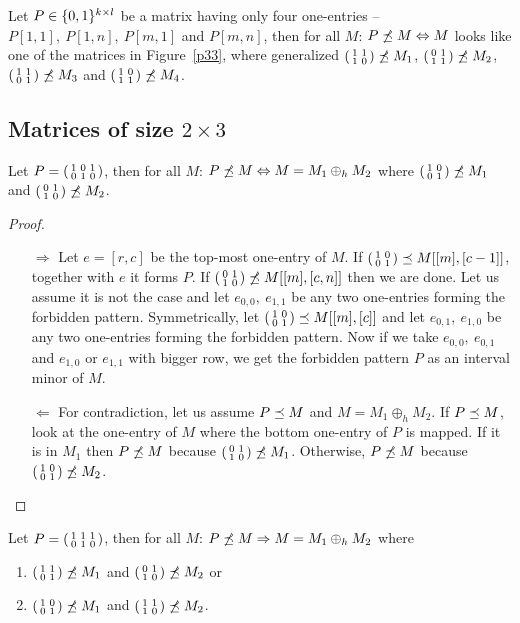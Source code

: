 \begin{thm}
Let $P\in\Pat$ be a matrix having only four one-entries -- $P[1,1],\ P[1,n],\ P[m,1]$ and $P[m,n]$, then for all $M$: $\PnimM\Leftrightarrow M$ looks like one of the matrices in Figure~\ref{p33}, where generalized $\smm{1&1\\1&0}\nim M_1$, $\smm{0&1\\1&1}\nim M_2$, $\smm{1&1\\0&1}\nim M_3$ and $\smm{1&0\\1&1}\nim M_4$.
\end{thm}

\subsection{Matrices of size $2\times3$}
\begin{thm}
Let $P=\smm{1&0&1\\0&1&0}$, then for all $M$: $\PnimM\Leftrightarrow M=M_1\oplus_hM_2$ where $\smm{1&0\\0&1}\nim M_1$ and $\smm{0&1\\1&0}\nim M_2$.
\end{thm}
\begin{proof}
\begin{itemize}
\item[$\Rightarrow$] Let $e=[r,c]$ be the top-most one-entry of $M$. If $\smm{1&0\\0&1}\im M[[m],[c-1]]$, together with $e$ it forms $P$. If $\smm{0&1\\1&0}\nim M[[m],[c,n]]$ then we are done. Let us assume it is not the case and let $e_{0,0},\ e_{1,1}$ be any two one-entries forming the forbidden pattern. Symmetrically, let $\smm{1&0\\0&1}\im M[[m],[c]]$ and let $e_{0,1},\ e_{1,0}$ be any two one-entries forming the forbidden pattern. Now if we take $e_{0,0},\ e_{0,1}$ and $e_{1,0}$ or $e_{1,1}$ with bigger row, we get the forbidden pattern $P$ as an interval minor of $M$. 
\item[$\Leftarrow$] For contradiction, let us assume $\PimM$ and $M=M_1\oplus_hM_2$. If $\PimM$, look at the one-entry of $M$ where the bottom one-entry of $P$ is mapped. If it is in $M_1$ then $\PnimM$ because $\smm{0&1\\1&0}\nim M_1$. Otherwise, $\PnimM$ because $\smm{1&0\\0&1}\nim M_2$.
\end{itemize}
\end{proof}
\begin{lemma}
\label{lemma2}
Let $P=\smm{1&1&1\\0&1&0}$, then for all $M$: $\PnimM\Rightarrow M=M_1\oplus_hM_2$ where
\begin{enumerate}
\item $\smm{1&1\\0&1}\nim M_1$ and $\smm{0&1\\1&0}\nim M_2$ or
\item $\smm{1&0\\0&1}\nim M_1$ and $\smm{1&1\\1&0}\nim M_2$.
\end{enumerate}
\end{lemma}
